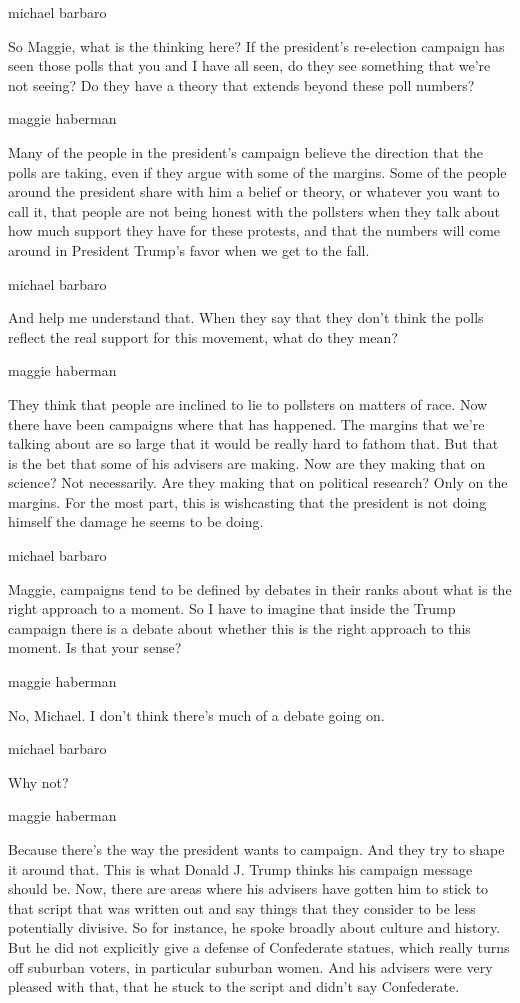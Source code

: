 michael barbaro

So Maggie, what is the thinking here? If the president's re-election
campaign has seen those polls that you and I have all seen, do they see
something that we're not seeing? Do they have a theory that extends
beyond these poll numbers?

maggie haberman

Many of the people in the president's campaign believe the direction
that the polls are taking, even if they argue with some of the margins.
Some of the people around the president share with him a belief or
theory, or whatever you want to call it, that people are not being
honest with the pollsters when they talk about how much support they
have for these protests, and that the numbers will come around in
President Trump's favor when we get to the fall.

michael barbaro

And help me understand that. When they say that they don't think the
polls reflect the real support for this movement, what do they mean?

maggie haberman

They think that people are inclined to lie to pollsters on matters of
race. Now there have been campaigns where that has happened. The margins
that we're talking about are so large that it would be really hard to
fathom that. But that is the bet that some of his advisers are making.
Now are they making that on science? Not necessarily. Are they making
that on political research? Only on the margins. For the most part, this
is wishcasting that the president is not doing himself the damage he
seems to be doing.

michael barbaro

Maggie, campaigns tend to be defined by debates in their ranks about
what is the right approach to a moment. So I have to imagine that inside
the Trump campaign there is a debate about whether this is the right
approach to this moment. Is that your sense?

maggie haberman

No, Michael. I don't think there's much of a debate going on.

michael barbaro

Why not?

maggie haberman

Because there's the way the president wants to campaign. And they try to
shape it around that. This is what Donald J. Trump thinks his campaign
message should be. Now, there are areas where his advisers have gotten
him to stick to that script that was written out and say things that
they consider to be less potentially divisive. So for instance, he spoke
broadly about culture and history. But he did not explicitly give a
defense of Confederate statues, which really turns off suburban voters,
in particular suburban women. And his advisers were very pleased with
that, that he stuck to the script and didn't say Confederate.

